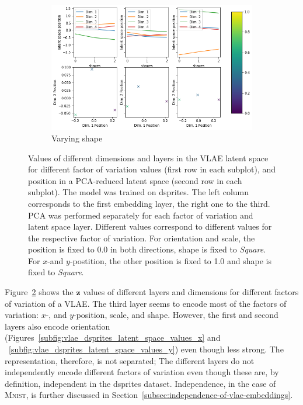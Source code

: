 \begin{figure}
\begin{subfigure}{.48\textwidth}
        \includegraphics[width=\textwidth]{images/latent_space_traversals/vlae_dsprites_shape_latent_space_values.png}
        \caption{Varying shape}
        \label{subfig:vlae_dsprites_latent_space_values_shape}
    \end{subfigure}
    \caption[\ac{VLAE} on dsprites: Latent Space Values]{Values of different dimensions and layers in the \ac{VLAE} latent space for different factor of variation values (first row in each subplot), and position in a \ac{PCA}-reduced latent space (second row in each subplot). The model was trained on dsprites. The left column corresponds to the first embedding layer, the right one to the third. \ac{PCA} was performed separately for each factor of variation and latent space layer. Different values correspond to different values for the respective factor of variation. For orientation and scale, the position is fixed to 0.0 in both directions, shape is fixed to \textit{Square}. For $x$-and $y$-postition, the other position is fixed to 1.0 and shape is fixed to \textit{Square}.}
    \label{fig:vlae_dsprites_latent_space_values}
\end{figure}
Figure~\ref{fig:vlae_dsprites_latent_space_values} shows the $\bm{z}$ values of different layers and dimensions for different factors of variation of a \ac{VLAE}.
The third layer seems to encode most of the factors of variation: $x$-, and $y$-position, scale, and shape.
However, the first and second layers also encode orientation (Figures~\ref{subfig:vlae_dsprites_latent_space_values_x} and ~\ref{subfig:vlae_dsprites_latent_space_values_y}) even though less strong.
The representation, therefore, is not separated;
The different layers do not independently encode different factors of variation even though these are, by definition, independent in the dsprites dataset.
Independence, in the case of \textsc{Mnist}, is further discussed in Section~\ref{subsec:independence-of-vlae-embeddings}.

